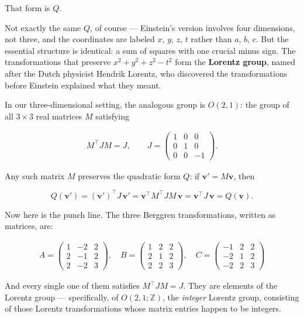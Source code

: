 \documentclass[11pt,twoside,openright]{book}
\theoremstyle{definition}
\theoremstyle{remark}
\begin{document}
That form is $Q$.

Not exactly the same $Q$, of course --- Einstein's version involves four dimensions, not three, and the coordinates are labeled $x$, $y$, $z$, $t$ rather than $a$, $b$, $c$. But the essential structure is identical: a sum of squares with one crucial minus sign. The transformations that preserve $x^2 + y^2 + z^2 - t^2$ form the \textbf{Lorentz group}, named after the Dutch physicist Hendrik Lorentz, who discovered the transformations before Einstein explained what they meant.

In our three-dimensional setting, the analogous group is $O(2,1)$: the group of all $3 \times 3$ real matrices $M$ satisfying

\begin{align*}
M^\top J M = J, \qquad J = \begin{pmatrix} 1 & 0 & 0 \\ 0 & 1 & 0 \\ 0 & 0 & -1 \end{pmatrix}.
\end{align*}

Any such matrix $M$ preserves the quadratic form $Q$: if $\mathbf{v}' = M\mathbf{v}$, then

\[Q(\mathbf{v}') = (\mathbf{v}')^\top J\, \mathbf{v}' = \mathbf{v}^\top M^\top J M\, \mathbf{v} = \mathbf{v}^\top J\, \mathbf{v} = Q(\mathbf{v}).\]

Now here is the punch line. The three Berggren transformations, written as matrices, are:

\begin{align*}
A = \begin{pmatrix} 1 & -2 & 2 \\ 2 & -1 & 2 \\ 2 & -2 & 3 \end{pmatrix}, \quad B = \begin{pmatrix} 1 & 2 & 2 \\ 2 & 1 & 2 \\ 2 & 2 & 3 \end{pmatrix}, \quad C = \begin{pmatrix} -1 & 2 & 2 \\ -2 & 1 & 2 \\ -2 & 2 & 3 \end{pmatrix}
\end{align*}

And every single one of them satisfies $M^\top J M = J$. They are elements of the Lorentz group --- specifically, of $O(2,1; \mathbb{Z})$, the \textit{integer} Lorentz group, consisting of those Lorentz transformations whose matrix entries happen to be integers.
\end{document}

